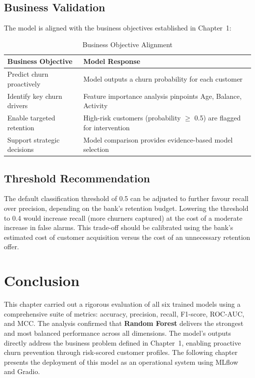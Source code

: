 \subsection{Business Validation}

The model is aligned with the business objectives established in Chapter~1:

\begin{table}[H]
    \centering
    \caption{Business Objective Alignment}
    \label{tab:business_alignment}
    \vspace{3mm}
    \begin{tabular}{|p{7cm}|p{7cm}|}
        \hline
        \textbf{Business Objective} & \textbf{Model Response} \\
        \hline
        Predict churn proactively & Model outputs a churn probability for each customer \\
        \hline
        Identify key churn drivers & Feature importance analysis pinpoints Age, Balance, Activity \\
        \hline
        Enable targeted retention & High-risk customers (probability $\geq$ 0.5) are flagged for intervention \\
        \hline
        Support strategic decisions & Model comparison provides evidence-based model selection \\
        \hline
    \end{tabular}
\end{table}

\subsection{Threshold Recommendation}

The default classification threshold of 0.5 can be adjusted to further favour recall over precision, depending on the bank's retention budget. Lowering the threshold to 0.4 would increase recall (more churners captured) at the cost of a moderate increase in false alarms. This trade-off should be calibrated using the bank's estimated cost of customer acquisition versus the cost of an unnecessary retention offer.

\section{Conclusion}

This chapter carried out a rigorous evaluation of all six trained models using a comprehensive suite of metrics: accuracy, precision, recall, F1-score, ROC-AUC, and MCC. The analysis confirmed that \textbf{Random Forest} delivers the strongest and most balanced performance across all dimensions. The model's outputs directly address the business problem defined in Chapter~1, enabling proactive churn prevention through risk-scored customer profiles. The following chapter presents the deployment of this model as an operational system using MLflow and Gradio.
